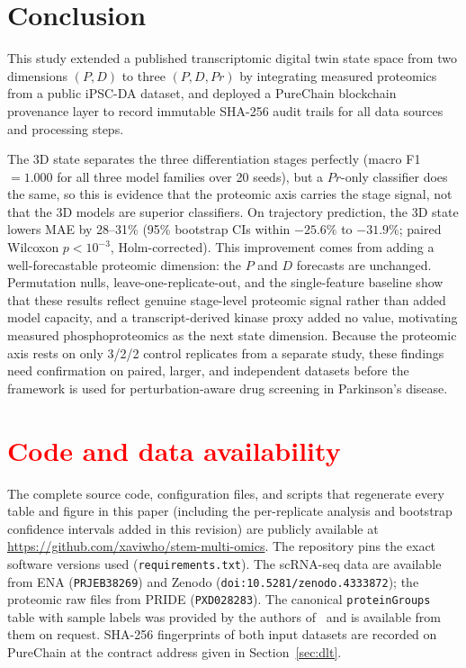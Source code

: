 \documentclass[5p,times,twocolumn]{elsarticle}
\newcommand{\rtag}[1]{}
\newcommand{\rev}[2]{\rtag{#1}\textcolor{red}{#2}}
\newenvironment{revblock}[1]{\par\color{red}\rtag{#1}\ignorespaces}{\par}
\begin{document}
\section{Conclusion}
This study extended a published transcriptomic digital twin
state space from two dimensions $(P, D)$ to three
$(P, D, Pr)$ by integrating measured proteomics from a
public iPSC-DA dataset, and deployed a PureChain blockchain
provenance layer to record immutable SHA-256 audit trails
for all data sources and processing steps.
\begin{revblock}{R1.8,R1.9,R1.5,R1.14}
  The 3D state separates the three differentiation stages
  perfectly (macro F1 $= 1.000$ for all three model families over
  20 seeds), but a $Pr$-only classifier does the same, so this is
  evidence that the proteomic axis carries the stage signal, not
  that the 3D models are superior classifiers.
  On trajectory prediction, the 3D state lowers MAE by 28--31\%
  (95\% bootstrap CIs within $-25.6\%$ to $-31.9\%$; paired
  Wilcoxon $p < 10^{-3}$, Holm-corrected). This improvement
  comes from adding a well-forecastable proteomic dimension: the
  $P$ and $D$ forecasts are unchanged.
  Permutation nulls, leave-one-replicate-out, and the
  single-feature baseline show that these results reflect genuine
  stage-level proteomic signal rather than added model capacity,
  and a transcript-derived kinase proxy added no value,
  motivating measured phosphoproteomics as the next state
  dimension.
  Because the proteomic axis rests on only 3/2/2 control
  replicates from a separate study, these findings need
  confirmation on paired, larger, and independent datasets before
  the framework is used for perturbation-aware drug screening in
  Parkinson's disease.
\end{revblock}
\section*{\rev{R2.7}{Code and data availability}}

\begin{revblock}{R2.7}
  The complete source code, configuration files, and scripts that
  regenerate every table and figure in this paper (including the
  per-replicate analysis and bootstrap confidence intervals added
  in this revision) are publicly available at
  \url{https://github.com/xaviwho/stem-multi-omics}.
  The repository pins the exact software versions used
  (\texttt{requirements.txt}).
  The scRNA-seq data are available from ENA (\texttt{PRJEB38269})
  and Zenodo (\texttt{doi:10.5281/zenodo.4333872}); the proteomic
  raw files from PRIDE (\texttt{PXD028283}). The canonical
  \texttt{proteinGroups} table with sample labels was provided by
  the authors of~\cite{novak2022single} and is available from
  them on request. SHA-256 fingerprints of both input datasets
  are recorded on PureChain at the contract address given in
  Section~\ref{sec:dlt}.
\end{revblock}
\end{document}
